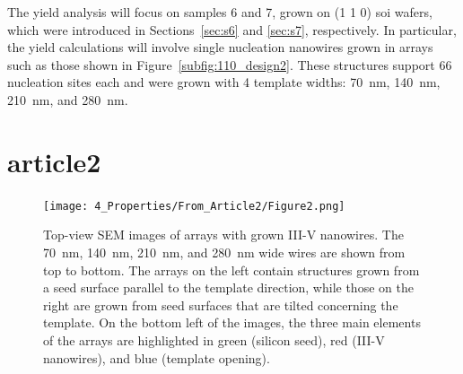 The yield analysis will focus on samples \num{6} and \num{7}, grown on \hkl(1 1 0) \acs{soi} wafers, which were introduced in Sections~\ref{sec:s6} and \ref{sec:s7}, respectively. In particular, the yield calculations will involve single nucleation nanowires grown in arrays such as those shown in Figure~\ref{subfig:110_design2}. These structures support \num{66} nucleation sites each and were grown with 4 template widths: \qty{70}{nm}, \qty{140}{nm}, \qty{210}{nm}, and \qty{280}{nm}.



















\section{article2}
\begin{figure}
    \centering
    \texttt{[image: 4\_Properties/From\_Article2/Figure2.png]}
    \caption{Top-view SEM images of arrays with grown III-V nanowires. The \qty{70}{\nm}, \qty{140}{\nm}, \qty{210}{\nm}, and \qty{280}{\nm} wide wires are shown from top to bottom. The arrays on the left contain structures grown from a seed surface parallel to the template direction, while those on the right are grown from seed surfaces that are tilted concerning the template. On the bottom left of the images, the three main elements of the arrays are highlighted in green (silicon seed), red (III-V nanowires), and blue (template opening).}
    \label{fig:arrays}
\end{figure}

